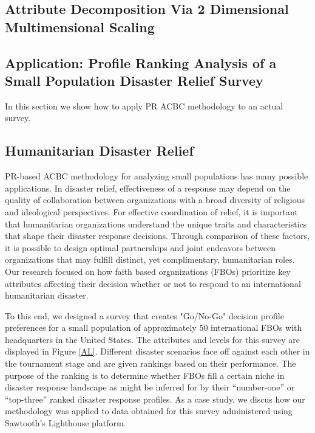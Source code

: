 \documentclass[a4paper, 12pt]{article}
\begin{document}
\subsection{Attribute Decomposition Via 2 Dimensional Multimensional Scaling}
\subsection{Application: Profile Ranking Analysis of a Small Population Disaster Relief Survey}


In this section we show how to apply PR ACBC methodology to an actual survey.

\subsection{Humanitarian Disaster Relief}

PR-based ACBC methodology for analyzing small populations has many possible applications. In disaster relief, effectiveness of a response may depend on the quality of collaboration between organizations with a broad diversity of religious and ideological perspectives. For effective coordination of relief, it is important that humanitarian organizations understand the unique traits and characteristics that shape their disaster response decisions. Through comparison of these factors, it is possible to design optimal partnerships and joint endeavors between organizations that may fulfill distinct, yet complimentary, humanitarian roles. Our research focused on how faith based organizations (FBOs) prioritize key attributes affecting their decision whether or not to respond to an international humanitarian disaster.

To this end, we designed a survey that creates "Go/No-Go" decision profile preferences for a small population of approximately 50 international FBOs with headquarters in the United States. The attributes and levels for this survey are displayed in Figure \ref{AL}. Different disaster scenarios face off against each other in the tournament stage and are given rankings based on their performance. The purpose of the ranking is to determine whether FBOs fill a certain niche in disaster response landscape as might be inferred for by their ``number-one'' or ``top-three'' ranked disaster response profiles. As a case study, we discus how our methodology was applied to data obtained for this survey administered using Sawtooth's Lighthouse platform.
\end{document}
